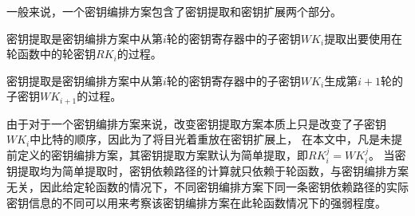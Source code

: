 一般来说，一个密钥编排方案包含了密钥提取和密钥扩展两个部分。
\begin{defn}[密钥提取]
    密钥提取是密钥编排方案中从第$i$轮的密钥寄存器中的子密钥$WK_i$提取出要使用在轮函数中的轮密钥$RK_i$的过程。
\end{defn}
\begin{defn}[密钥扩展]
    密钥提取是密钥编排方案中从第$i$轮的密钥寄存器中的子密钥$WK_i$生成第$i+1$轮的子密钥$WK_{i+1}$的过程。
\end{defn}
由于对于一个密钥编排方案来说，改变密钥提取方案本质上只是改变了子密钥$WK_i$中比特的顺序，因此为了将目光着重放在密钥扩展上，
在本文中，凡是未提前定义的密钥编排方案，其密钥提取方案默认为简单提取，即$RK_i^j=WK_i^j$。
当密钥提取均为简单提取时，密钥依赖路径的计算就只依赖于轮函数，与密钥编排方案无关，因此给定轮函数的情况下，不同密钥编排方案下同一条密钥依赖路径的实际密钥信息的不同可以用来考察该密钥编排方案在此轮函数情况下的强弱程度。

